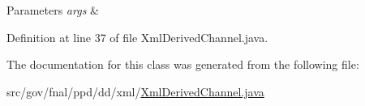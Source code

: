 \begin{DoxyParams}{Parameters}
{\em args} & \\
\hline
\end{DoxyParams}


Definition at line 37 of file Xml\-Derived\-Channel.\-java.



The documentation for this class was generated from the following file\-:\begin{DoxyCompactItemize}
\item 
src/gov/fnal/ppd/dd/xml/\hyperlink{XmlDerivedChannel_8java}{Xml\-Derived\-Channel.\-java}\end{DoxyCompactItemize}
